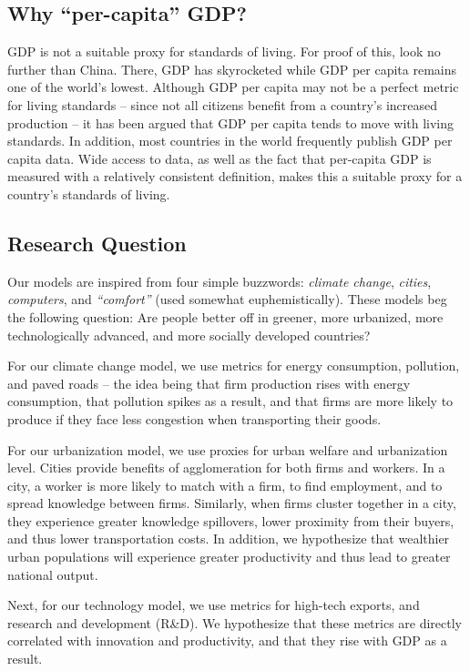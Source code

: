\documentclass[12pt]{article}
\begin{document}
\subsection{Why ``per-capita'' GDP?}
GDP is not a suitable proxy for standards of living. For proof of this, look no further than China. There, GDP has skyrocketed while GDP per capita remains one of the world's lowest. Although GDP per capita may not be a perfect metric for living standards -- since not all citizens benefit from a country's increased production -- it has been argued that GDP per capita tends to move with living standards. In addition, most countries in the world frequently publish GDP per capita data. Wide access to data, as well as the fact that per-capita GDP is measured with a relatively consistent definition, makes this a suitable proxy for a country's standards of living.

\subsection{Research Question}
Our models are inspired from four simple buzzwords: \emph{climate change}, \emph{cities}, \emph{computers}, and \emph{``comfort''} (used somewhat euphemistically). These models beg the following question: Are people better off in greener, more urbanized, more technologically advanced, and more socially developed countries?

For our climate change model, we use metrics for energy consumption, pollution, and paved roads -- the idea being that firm production rises with energy consumption, that pollution spikes as a result, and that firms are more likely to produce if they face less congestion when transporting their goods.

For our urbanization model, we use proxies for urban welfare and urbanization level. Cities provide benefits of agglomeration for both firms and workers. In a city, a worker is more likely to match with a firm, to find employment, and to spread knowledge between firms. Similarly, when firms cluster together in a city, they experience greater knowledge spillovers, lower proximity from their buyers, and thus lower transportation costs. In addition, we hypothesize that wealthier urban populations will experience greater productivity and thus lead to greater national output.

Next, for our technology model, we use metrics for high-tech exports, and research and development (R\&D). We hypothesize that these metrics are directly correlated with innovation and productivity, and that they rise with GDP as a result.
\end{document}
